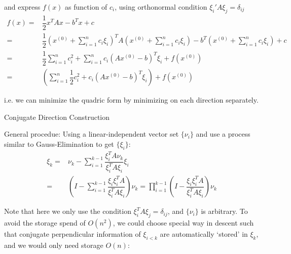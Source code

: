     and express $ f(x) $ as function of $ c_i $, using orthonormal condition $ \xi _i'A\xi _j=\delta_{ij} $
    \begin{align}
        f(x)=& \dfrac{1}{2}x^TAx-b^Tx+c\\
        =&\dfrac{1}{2}(x^{(0)}+ \sum_{i=1}^nc_i\xi _i)^TA(x^{(0)}+ \sum_{i=1}^nc_i\xi _i)-b^T(x^{(0)}+ \sum_{i=1}^nc_i\xi _i)+c\\
        =&\dfrac{1}{2}\sum_{i=1}^n c_i^2+\sum_{i=1}^nc_i (Ax^{(0)}-b)^T\xi _i+f\left(x^{(0)}\right)\\
        =&\left(\sum_{i=1}^n\dfrac{1}{2}c_i^2+c_i(Ax^{(0)}-b)^T\xi _i\right)+f\left(x^{(0)}\right)
    \end{align}
    
    i.e. we can minimize the quadric form by minimizing on each direction separately.

\begin{point}
    Conjugate Direction Construction
\end{point}

    General procedue: Using a linear-independent vector set $ \{\nu_i\} $ and use a process similar to Gauss-Elimination to get $ \{\xi _i\} $:
    \begin{align}
        \xi _k=&\nu_k-\sum_{i=1}^{k-1}\dfrac{\xi _i^TA\nu_k}{\xi _i^TA\xi _i}\xi _i\\
        =&\left(I-\sum_{i=1}^{k-1}\dfrac{\xi _i\xi _i^TA}{\xi _i^TA\xi _i}\right)\nu_k=\prod_{i=1}^{k-1}\left(I-\dfrac{\xi _i\xi _i^TA}{\xi _i^TA\xi _i}\right)\nu_k
    \end{align}
         
    Note that here we only use the condition $ \xi _i^TA\xi _j=\delta _{ij} $, and $ \{\nu_i\} $ is arbitrary. To avoid the storage spend of $ O(n^2) $, we could choose special way in descent such that conjugate perpendicular information of $ \xi _{i<k} $ are automatically `stored' in $ \xi _k $, and we would only need storage $ O(n) $:

